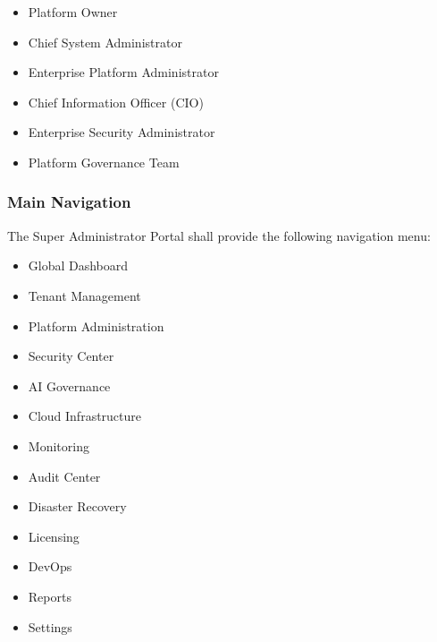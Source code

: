 \begin{itemize}

\item Platform Owner

\item Chief System Administrator

\item Enterprise Platform Administrator

\item Chief Information Officer (CIO)

\item Enterprise Security Administrator

\item Platform Governance Team

\end{itemize}


\subsubsection*{Main Navigation}

The Super Administrator Portal shall provide the following navigation
menu:

\begin{itemize}

\item Global Dashboard

\item Tenant Management

\item Platform Administration

\item Security Center

\item AI Governance

\item Cloud Infrastructure

\item Monitoring

\item Audit Center

\item Disaster Recovery

\item Licensing

\item DevOps

\item Reports

\item Settings

\end{itemize}

